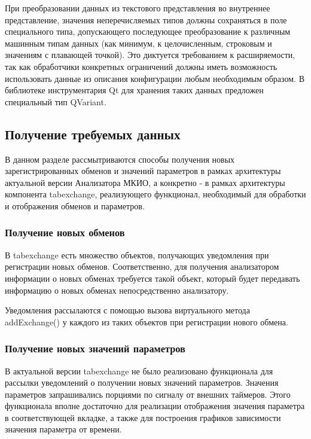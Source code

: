При преобразовании данных из текстового представления во внутреннее 
представление, значения неперечисляемых типов должны сохраняться в поле 
специального типа, допускающего последующее преобразование к различным машинным 
типам данных (как минимум, к целочисленным, строковым и значениям с плавающей 
точкой). Это диктуется требованием к расширяемости, так как обработчики 
конкретных ограничений должны иметь возможность использовать данные из описания 
конфигурации любым необходимым образом. В библиотеке инструментария Qt для 
хранения таких данных предложен специальный тип QVariant.

\subsection{Получение требуемых данных}

В данном разделе рассмытриваются способы получения новых 
зарегистрированных обменов и значений параметров в рамках архитектуры 
актуальной версии Анализатора МКИО, а конкретно - в рамках архитектуры 
компонента tabexchange, реализующего функционал, необходимый для обработки и 
отображения обменов и параметров.

\subsubsection{Получение новых обменов}

В tabexchange есть множество объектов, получающих уведомления при 
регистрации новых обменов. Соответственно, для получения анализатором 
информации о новых обменах требуется такой объект, который будет 
передавать информацию о новых обменах непосредственно анализатору.

Уведомления рассылаются с помощью вызова виртуального метода addExchange() у 
каждого из таких объектов при регистрации нового обмена.

\subsubsection{Получение новых значений параметров}

В актуальной версии tabexchange не было реализовано функционала для рассылки 
уведомлений о получении новых значений параметров. Значения параметров 
запрашивались порциями по сигналу от внешних таймеров. Этого функционала вполне 
достаточно для реализации отображения значения параметра в соответствующей 
вкладке, а также для построения графиков зависимости значения параметра от 
времени. 

